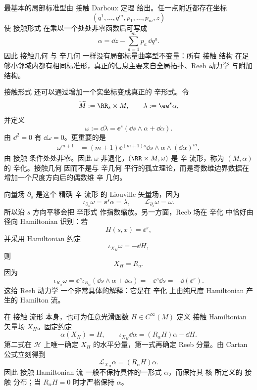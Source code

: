 最基本的局部标准型由 接触 Darboux 定理 给出。任一点附近都存在坐标
\[
(q^1,\ldots,q^m,p_1,\ldots,p_m,z)
\]
使 接触形式 在乘以一个处处非零函数后可写成
\begin{equation*}\alpha
=\dd z-\sum_{a=1}^m p_a\,\dd q^a.\end{equation*}
因此 接触几何 与 辛几何 一样没有局部标量曲率型不变量：所有 接触 结构 在足够小邻域内都有相同标准形，真正的信息主要来自全局拓扑、Reeb 动力学 与附加结构。

接触形式 还可以通过增加一个实坐标变成真正的 辛形式。令
\[
\widetilde M:=\RR_s\times M,
\qquad
\lambda:=\ee^s\alpha,
\]
并定义
\begin{equation}
\boxed{
\omega:=\dd\lambda
=\ee^s(\dd s\wedge\alpha+\dd\alpha).
}
\label{eq:math-dg-contact-symplectization}
\end{equation}
由 $\dd^2=0$ 有 $\dd\omega=0$。更重要的是
\begin{align*}
\omega^{m+1}
&=(m+1)\ee^{(m+1)s}
\dd s\wedge\alpha\wedge(\dd\alpha)^m,
\end{align*}
由 接触 条件处处非零。因此 $\omega$ 非退化，$(\RR\times M,\omega)$ 是 辛 流形，称为 $(M,\alpha)$ 的 辛化。接触几何 因而不是与 辛几何 平行的孤立理论，而是奇数维边界数据在增加一个尺度方向后的偶数维 辛 几何。

向量场 $\partial_s$ 是这个 精确 辛 流形 的 Liouville 矢量场，因为
\begin{equation*}\iota_{\partial_s}\omega
=\ee^s\alpha=\lambda,
\qquad
\mathcal L_{\partial_s}\omega=\omega.\end{equation*}
所以沿 $s$ 方向平移会把 辛形式 作指数缩放。另一方面，Reeb 场在 辛化 中恰好由径向 Hamiltonian 识别：若
\[
H(s,x)=\ee^s,
\]
并采用 Hamiltonian 约定
\[
\iota_{X_H}\omega=-\dd H,
\]
则
\begin{equation*}X_H=R_\alpha.\end{equation*}
因为
\[
\iota_{R_\alpha}\omega
=\ee^s\iota_{R_\alpha}(\dd s\wedge\alpha+\dd\alpha)
=-\ee^s\dd s
=-\dd(\ee^s).
\]
这给 Reeb 动力学 一个非常具体的解释：它是在 辛化 上由纯尺度 Hamiltonian 产生的 Hamilton 流。

在 接触 流形 本身，也可为任意光滑函数 $H\in C^\infty(M)$ 定义 接触 Hamiltonian 矢量场 $X_H$。固定约定
\begin{equation}
\boxed{
\alpha(X_H)=H,
\qquad
\iota_{X_H}\dd\alpha
=(R_\alpha H)\alpha-\dd H.
}
\label{eq:math-dg-contact-hamiltonian}
\end{equation}
第二式在 $\mathcal H$ 上唯一确定 $X_H$ 的水平分量，第一式再确定 Reeb 分量。由 Cartan 公式立刻得到
\begin{equation*}\boxed{
\mathcal L_{X_H}\alpha
=(R_\alpha H)\alpha.
}\end{equation*}
因此 接触 Hamiltonian 流 一般不保持具体的一形式 $\alpha$，而保持其 核 所定义的 接触 分布；当 $R_\alpha H=0$ 时才严格保持 $\alpha$。

